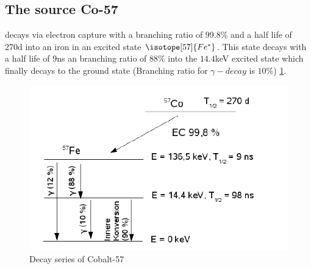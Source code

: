 \subsection{The source Co-57}
 decays via electron capture with a branching ratio of $99.8 \%$ and a half life of 270d into an iron in an excited state $\isotope[57]{Fe^*}$. This state decays with a half life of 9ns an branching ratio of $88\%$ into the $14.4$keV excited state which finally decays to the ground state (Branching ratio for $\gamma-decay$ is $10\%$) \ref{fig:principles:Zerfallsschema2}.
\begin{figure}[hbt]
	\centering
	\includegraphics[width=0.5\linewidth]{graphics/Zerfallsschema2}
	\caption[Co-57 decay]{Decay series of Cobalt-57}
	\label{fig:principles:Zerfallsschema2}
\end{figure}
